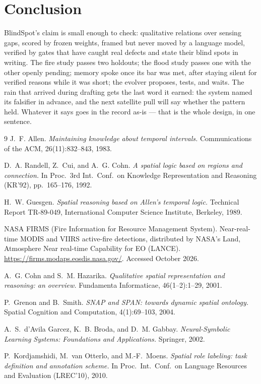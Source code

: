 \documentclass[11pt]{article}
\begin{document}
\section{Conclusion}
\label{sec:conclusion}

BlindSpot's claim is small enough to check: qualitative relations over
sensing gaps, scored by frozen weights, framed but never moved by a language
model, verified by gates that have caught real defects and state their blind
spots in writing. The fire study passes two holdouts; the flood study passes
one with the other openly pending; memory spoke once its bar was met, after
staying silent for verified reasons while it was short; the evolver proposes,
tests, and waits. The rain that arrived during drafting gets the last word it earned:
the system named its falsifier in advance, and the next satellite pull will
say whether the pattern held. Whatever it says goes in the record as-is ---
that is the whole design, in one sentence.

\begin{thebibliography}{9}
 J.~F. Allen.
\textit{Maintaining knowledge about temporal intervals.}
Communications of the ACM, 26(11):832--843, 1983.

 D.~A. Randell, Z.~Cui, and A.~G. Cohn.
\textit{A spatial logic based on regions and connection.}
In Proc.\ 3rd Int.\ Conf.\ on Knowledge Representation and Reasoning
(KR'92), pp.\ 165--176, 1992.

 H.~W. Guesgen.
\textit{Spatial reasoning based on Allen's temporal logic.}
Technical Report TR-89-049, International Computer Science Institute,
Berkeley, 1989.

 NASA FIRMS (Fire Information for Resource Management System).
Near-real-time MODIS and VIIRS active-fire detections, distributed by NASA's
Land, Atmosphere Near real-time Capability for EO (LANCE).
\url{https://firms.modaps.eosdis.nasa.gov/}. Accessed October 2026.

 A.~G. Cohn and S.~M. Hazarika.
\textit{Qualitative spatial representation and reasoning: an overview.}
Fundamenta Informaticae, 46(1--2):1--29, 2001.

 P.~Grenon and B.~Smith.
\textit{SNAP and SPAN: towards dynamic spatial ontology.}
Spatial Cognition and Computation, 4(1):69--103, 2004.

 A.~S.~d'Avila Garcez, K.~B. Broda, and D.~M. Gabbay.
\textit{Neural-Symbolic Learning Systems: Foundations and Applications.}
Springer, 2002.

 P.~Kordjamshidi, M.~van Otterlo, and M.-F.~Moens.
\textit{Spatial role labeling: task definition and annotation scheme.}
In Proc.\ Int.\ Conf.\ on Language Resources and Evaluation (LREC'10), 2010.
\end{thebibliography}
\end{document}
